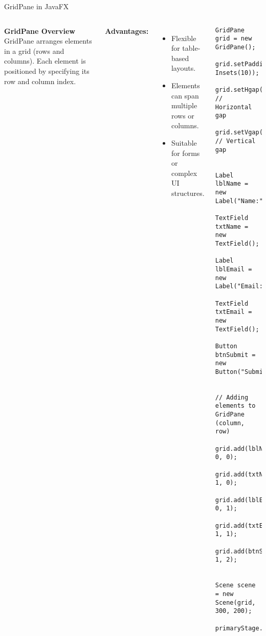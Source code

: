 \documentclass[aspectratio=169, table]{beamer}
\begin{document}
\begin{frame}[fragile]{GridPane in JavaFX}
	\begin{columns}[t]
		\textbf{GridPane Overview} \\
		GridPane arranges elements in a grid (rows and columns).  
		Each element is positioned by specifying its row and column index.
		
		\textbf{Advantages:}
		\begin{itemize}
			\item Flexible for table-based layouts.
			\item Elements can span multiple rows or columns.
			\item Suitable for forms or complex UI structures.
		\end{itemize}
		
		\begin{lstlisting}[style=JavaStyle]
			GridPane grid = new GridPane();
			grid.setPadding(new Insets(10));
			grid.setHgap(10); // Horizontal gap
			grid.setVgap(10); // Vertical gap
			
			Label lblName = new Label("Name:");
			TextField txtName = new TextField();
			Label lblEmail = new Label("Email:");
			TextField txtEmail = new TextField();
			Button btnSubmit = new Button("Submit");
			
			// Adding elements to GridPane (column, row)
			grid.add(lblName, 0, 0);
			grid.add(txtName, 1, 0);
			grid.add(lblEmail, 0, 1);
			grid.add(txtEmail, 1, 1);
			grid.add(btnSubmit, 1, 2);
			
			Scene scene = new Scene(grid, 300, 200);
			primaryStage.setScene(scene);
		\end{lstlisting}
	\end{columns}
\end{frame}
\end{document}
